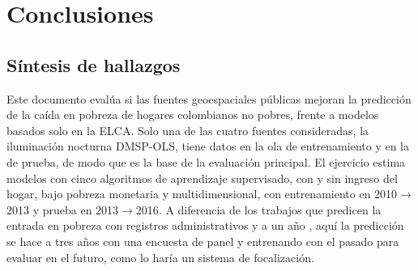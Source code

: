 \documentclass[12pt, letterpaper]{article}
\begin{document}
\section{Conclusiones}
\label{sec:conclusiones}

\subsection{Síntesis de hallazgos}
\label{subsec:sintesis}

Este documento evalúa si las fuentes geoespaciales públicas mejoran la
predicción de la caída en pobreza de hogares colombianos no pobres, frente
a modelos basados solo en la ELCA. Solo una de las cuatro fuentes
consideradas, la iluminación nocturna DMSP-OLS, tiene datos en la ola de
entrenamiento y en la de prueba, de modo que es la base de la evaluación
principal. El ejercicio estima modelos con cinco algoritmos de aprendizaje
supervisado, con y sin ingreso del hogar, bajo pobreza monetaria y multidimensional, con entrenamiento en
2010$\to$2013 y prueba en 2013$\to$2016. A diferencia de los trabajos que
predicen la entrada en pobreza con registros administrativos y a un año
\parencite{burger2021,hohberg2018}, aquí la predicción se hace a tres años
con una encuesta de panel y entrenando con el pasado para evaluar en el
futuro, como lo haría un sistema de focalización.
\end{document}
